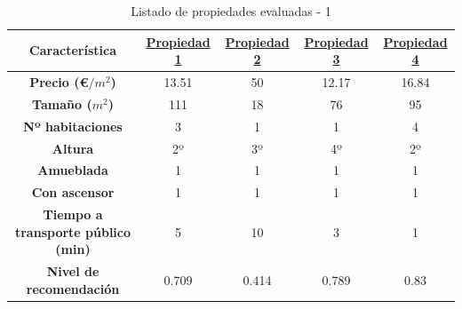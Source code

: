 \documentclass[12pt]{report} %
\begin{document}
    \begin{table}[h]
        \center
        \begin{tabular}{|c|cccc|}
            \hline
            \textbf{Característica} & \href{https://www.idealista.com/inmueble/106565852/}{Propiedad 1} & \href{https://www.idealista.com/inmueble/103969285/}{Propiedad 2} & \href{https://www.idealista.com/inmueble/104278344/}{Propiedad 3} & \href{https://www.idealista.com/inmueble/106224752/}{Propiedad 4} \\
            \hline
            \hline
            \textbf{Precio (€$/m^2$)}                  & 13.51 & 50    & 12.17 & 16.84 \\
            \textbf{Tamaño ($m^2$)}                    & 111   & 18    & 76    & 95    \\
            \textbf{Nº habitaciones}                   & 3     & 1     & 1     & 4     \\
            \textbf{Altura}                            & 2º    & 3º    & 4º    & 2º    \\
            \textbf{Amueblada\footnotemark[1]}         & 1     & 1     & 1     & 1     \\
            \textbf{Con ascensor\footnotemark[1]}      & 1     & 1     & 1     & 1     \\
            \textbf{Tiempo a transporte público (min)} & 5     & 10    & 3     & 1     \\
            \textbf{Nivel de recomendación}            & 0.709 & 0.414 & 0.789 & 0.83  \\
            \hline
        \end{tabular}
        \caption{Listado de propiedades evaluadas - 1}
    \end{table}
\end{document}
